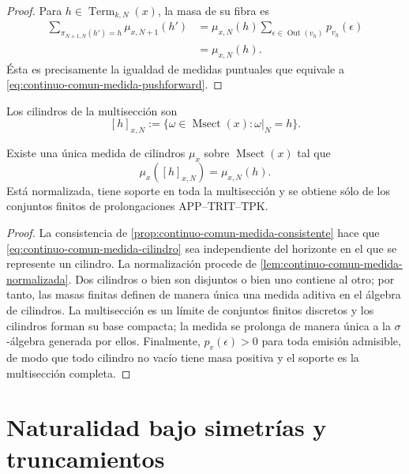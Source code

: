 \begin{proof}
Para \(h\in\operatorname{Term}_{k,N}(x)\), la masa de su fibra es
\begin{align*}
 \sum_{\pi_{N+1,N}(h')=h}\mu_{x,N+1}(h')
 &=\mu_{x,N}(h)
   \sum_{\epsilon\in\operatorname{Out}(v_h)}p_{v_h}(\epsilon)\\
 &=\mu_{x,N}(h).
\end{align*}
Ésta es precisamente la igualdad de medidas puntuales que equivale a
\eqref{eq:continuo-comun-medida-pushforward}.
\end{proof}

Los cilindros de la multisección son
\begin{equation}
\label{eq:continuo-comun-cilindro-msect}
 [h]_{x,N}
 :=\{\omega\in\operatorname{Msect}(x):
       \omega|_N=h\}.
\end{equation}

\begin{theorem}
\label{thm:continuo-comun-medida-canonica}
Existe una única medida de cilindros \(\mu_x\) sobre
\(\operatorname{Msect}(x)\) tal que
\begin{equation}
\label{eq:continuo-comun-medida-cilindro}
 \mu_x([h]_{x,N})=\mu_{x,N}(h).
\end{equation}
Está normalizada, tiene soporte en toda la multisección y se obtiene sólo de
los conjuntos finitos de prolongaciones APP--TRIT--TPK.
\end{theorem}

\begin{proof}
La consistencia de
\cref{prop:continuo-comun-medida-consistente} hace que
\eqref{eq:continuo-comun-medida-cilindro} sea independiente del horizonte en
el que se represente un cilindro.  La normalización procede de
\cref{lem:continuo-comun-medida-normalizada}.  Dos cilindros o bien son
disjuntos o bien uno contiene al otro; por tanto, las masas finitas definen
de manera única una medida aditiva en el álgebra de cilindros.  La
multisección es un límite de conjuntos finitos discretos y los cilindros
forman su base compacta; la medida se prolonga de manera única a la
\(\sigma\)-álgebra generada por ellos.  Finalmente,
\(p_v(\epsilon)>0\) para toda emisión admisible, de modo que todo cilindro no
vacío tiene masa positiva y el soporte es la multisección completa.
\end{proof}

\section{Naturalidad bajo simetrías y truncamientos}
\label{sec:continuo-comun-naturalidad}


